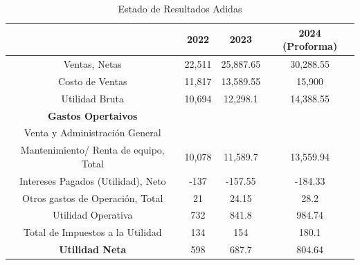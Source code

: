\documentclass[a4paper,12pt]{article}
\begin{document}
\begin{table}[ht!]
    \centering
    \begin{tabular}{c c c c}
        \hline
         &  \textbf{2022} &  \textbf{2023} &  \textbf{2024 (Proforma)} \\
        \hline
        Ventas, Netas & 22,511 & 25,887.65 & 30,288.55 \\
        \hline
        Costo de Ventas & 11,817 & 13,589.55 & 15,900 \\
        \hline
        Utilidad Bruta & 10,694 & 12,298.1 & 14,388.55 \\
        \hline
         \textbf{Gastos Opertaivos} &  &  &  \\
        \hline
        Venta y Administración General \\Mantenimiento/ Renta de equipo, Total & 10,078 & 11,589.7 & 13,559.94 \\
        \hline
        Intereses Pagados (Utilidad), Neto & -137 & -157.55 & -184.33 \\
        \hline
        Otros gastos de Operación, Total & 21 & 24.15 & 28.2 \\
        \hline
        Utilidad Operativa & 732 & 841.8 & 984.74 \\
        \hline
        Total de Impuestos a la Utilidad & 134 & 154 & 180.1 \\
        \hline
         \textbf{Utilidad Neta} & 598 & 687.7 & 804.64 \\
        \hline
    \end{tabular}
    \caption{Estado de Resultados Adidas}
    \label{tab:tabla18x4}
\end{table}



\clearpage
\newpage
\end{document}
